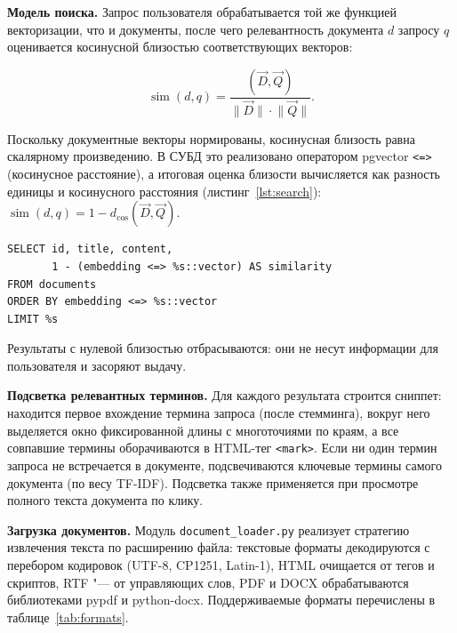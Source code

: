 \textbf{Модель поиска.} Запрос пользователя обрабатывается той же функцией
векторизации, что и документы, после чего релевантность документа $d$ запросу $q$
оценивается косинусной близостью соответствующих векторов:

\begin{equation}
	\operatorname{sim}(d, q) = \frac{(\vec{D}, \vec{Q})}{\lVert \vec{D} \rVert \cdot \lVert \vec{Q} \rVert}.
	\label{eq:cosine}
\end{equation}

Поскольку документные векторы нормированы, косинусная близость равна скалярному
произведению. В СУБД это реализовано оператором pgvector \texttt{<=>} (косинусное
расстояние), а итоговая оценка близости вычисляется как разность единицы и косинусного
расстояния (листинг~\ref{lst:search}): $\operatorname{sim}(d,q) = 1 - d_{\cos}(\vec{D}, \vec{Q})$.

\begin{lstlisting}[caption={Векторный поиск в PostgreSQL (pgvector).},label={lst:search}]
SELECT id, title, content,
       1 - (embedding <=> %s::vector) AS similarity
FROM documents
ORDER BY embedding <=> %s::vector
LIMIT %s
\end{lstlisting}

Результаты с нулевой близостью отбрасываются: они не несут информации для
пользователя и засоряют выдачу.

\textbf{Подсветка релевантных терминов.} Для каждого результата строится сниппет:
находится первое вхождение термина запроса (после стемминга), вокруг него выделяется
окно фиксированной длины с многоточиями по краям, а все совпавшие термины оборачиваются
в HTML-тег \texttt{<mark>}. Если ни один термин запроса не встречается в документе,
подсвечиваются ключевые термины самого документа (по весу TF-IDF). Подсветка также
применяется при просмотре полного текста документа по клику.

\textbf{Загрузка документов.} Модуль \texttt{document\_loader.py} реализует стратегию
извлечения текста по расширению файла: текстовые форматы декодируются с перебором
кодировок (UTF-8, CP1251, Latin-1), HTML очищается от тегов и скриптов, RTF "--- от
управляющих слов, PDF и DOCX обрабатываются библиотеками pypdf и python-docx.
Поддерживаемые форматы перечислены в таблице~\ref{tab:formats}.

